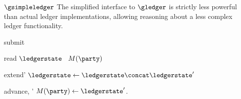 \begin{functionality}{$\gsimpleledger$}
    The simplified interface to $\gledger$ is strictly less powerful than
    actual ledger implementations, allowing reasoning about a less complex
    ledger functionality.
    \begin{statedecl}
    \end{statedecl}
    \begin{receive}{submit}{\tx}
      \State {}
    \end{receive}
    \begin{receive}{read}{}
      \If{$\party = \adversary$}
        \Return $\ledgerstate$
      \Else
        ~\Return $M(\party)$
      \EndIf
    \end{receive}
    \begin{receive}[adversary]{extend}{\ledgerstate'}
      \State \Let $\ledgerstate \gets \ledgerstate \concat \ledgerstate'$
    \end{receive}
    \begin{receive}[adversary]{advance}{\party, \ledgerstate'}
         \Let $M(\party) \gets \ledgerstate'$.
      \EndIf
    \end{receive}
\end{functionality}

